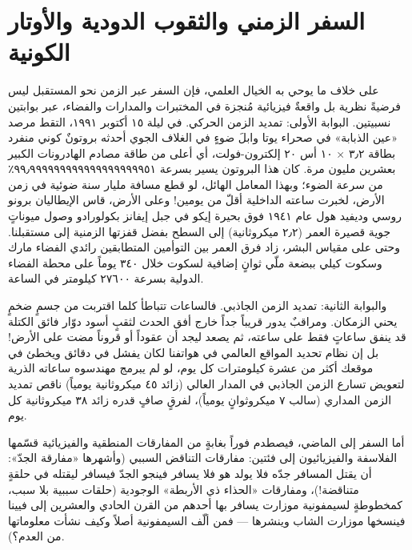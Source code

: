 \documentclass[12pt,a4paper,openany]{book}
\begin{document}
\chapter*{السفر الزمني والثقوب الدودية والأوتار الكونية}




على خلاف ما يوحي به الخيال العلمي، فإن السفر عبر الزمن نحو المستقبل ليس فرضيةً نظرية بل واقعةٌ فيزيائية مُنجزة في المختبرات والمدارات والفضاء، عبر بوابتين نسبيتين. البوابة الأولى: تمديد الزمن الحركي. في ليلة ١٥ أكتوبر ١٩٩١، التقط مرصد «عين الذبابة» في صحراء يوتا وابلَ ضوءٍ في الغلاف الجوي أحدثه بروتونٌ كوني منفرد بطاقة ٣٫٢ × ١٠ أس ٢٠ إلكترون-فولت، أي أعلى من طاقة مصادم الهادرونات الكبير بعشرين مليون مرة. كان هذا البروتون يسير بسرعة ٩٩٫٩٩٩٩٩٩٩٩٩٩٩٩٩٩٩٩٩٩٩٥١٪ من سرعة الضوء؛ وبهذا المعامل الهائل، لو قطع مسافة مليار سنة ضوئية في زمن الأرض، لخبرت ساعته الداخلية أقلّ من يومين! وعلى الأرض، قاس الإيطاليان برونو روسي وديفيد هول عام ١٩٤١ فوق بحيرة إيكو في جبل إيفانز بكولورادو وصول ميوناتٍ جوية قصيرة العمر (٢٫٢ ميكروثانية) إلى السطح بفضل قفزتها الزمنية إلى مستقبلنا. وحتى على مقياس البشر، زاد فرق العمر بين التوأمين المتطابقين رائدي الفضاء مارك وسكوت كيلي ببضعة ملّي ثوانٍ إضافية لسكوت خلال ٣٤٠ يوماً على محطة الفضاء الدولية بسرعة ٢٧٦٠٠ كيلومتر في الساعة.


والبوابة الثانية: تمديد الزمن الجاذبي. فالساعات تتباطأ كلما اقتربت من جسمٍ ضخمٍ يحني الزمكان. ومراقبٌ يدور قريباً جداً خارج أفق الحدث لثقبٍ أسود دوّار فائق الكتلة قد ينفق ساعاتٍ فقط على ساعته، ثم يصعد ليجد أن عقوداً أو قروناً مضت على الأرض! بل إن نظام تحديد المواقع العالمي في هواتفنا لكان يفشل في دقائق ويخطئ في موقعك أكثر من عشرة كيلومترات كل يوم، لو لم يبرمج مهندسوه ساعاته الذرية لتعويض تسارع الزمن الجاذبي في المدار العالي (زائد ٤٥ ميكروثانية يومياً) ناقص تمديد الزمن المداري (سالب ٧ ميكروثوانٍ يومياً)، لفرقٍ صافٍ قدره زائد ٣٨ ميكروثانية كل يوم.


أما السفر إلى الماضي، فيصطدم فوراً بغابةٍ من المفارقات المنطقية والفيزيائية قسّمها الفلاسفة والفيزيائيون إلى فئتين: مفارقات التناقض السببي (وأشهرها «مفارقة الجدّ»: أن يقتل المسافر جدّه فلا يولد هو فلا يسافر فينجو الجدّ فيسافر ليقتله في حلقةٍ متناقضة!)، ومفارقات «الحذاء ذي الأربطة» الوجودية (حلقات سببية بلا سبب، كمخطوطةٍ لسيمفونية موزارت يسافر بها أحدهم من القرن الحادي والعشرين إلى فيينا فينسخها موزارت الشاب وينشرها — فمن ألّف السيمفونية أصلاً وكيف نشأت معلوماتها من العدم؟).
\end{document}
